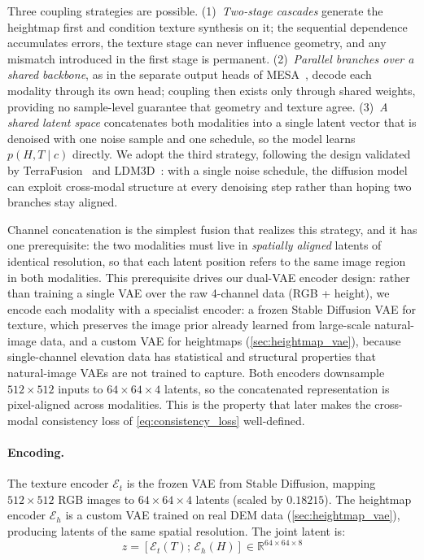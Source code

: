 \documentclass[review]{vgtc}                 %
\begin{document}
Three coupling strategies are possible.
(1)~\emph{Two-stage cascades} generate the heightmap first and condition texture synthesis on it; the sequential dependence accumulates errors, the texture stage can never influence geometry, and any mismatch introduced in the first stage is permanent.
(2)~\emph{Parallel branches over a shared backbone}, as in the separate output heads of MESA~\cite{MESA:2025}, decode each modality through its own head; coupling then exists only through shared weights, providing no sample-level guarantee that geometry and texture agree.
(3)~\emph{A shared latent space} concatenates both modalities into a single latent vector that is denoised with one noise sample and one schedule, so the model learns $p(H, T \mid c)$ directly.
We adopt the third strategy, following the design validated by TerraFusion~\cite{TerraFusion:2025} and LDM3D~\cite{LDM3D:2023}: with a single noise schedule, the diffusion model can exploit cross-modal structure at every denoising step rather than hoping two branches stay aligned.

Channel concatenation is the simplest fusion that realizes this strategy, and it has one prerequisite: the two modalities must live in \emph{spatially aligned} latents of identical resolution, so that each latent position refers to the same image region in both modalities.
This prerequisite drives our dual-VAE encoder design: rather than training a single VAE over the raw 4-channel data (RGB + height), we encode each modality with a specialist encoder: a frozen Stable Diffusion VAE for texture, which preserves the image prior already learned from large-scale natural-image data, and a custom VAE for heightmaps (\cref{sec:heightmap_vae}), because single-channel elevation data has statistical and structural properties that natural-image VAEs are not trained to capture.
Both encoders downsample $512 \times 512$ inputs to $64 \times 64 \times 4$ latents, so the concatenated representation is pixel-aligned across modalities. This is the property that later makes the cross-modal consistency loss of \cref{eq:consistency_loss} well-defined.

\paragraph{Encoding.}
The texture encoder $\mathcal{E}_t$ is the frozen VAE from Stable Diffusion, mapping $512 \times 512$ RGB images to $64 \times 64 \times 4$ latents (scaled by $0.18215$).
The heightmap encoder $\mathcal{E}_h$ is a custom VAE trained on real DEM data (\cref{sec:heightmap_vae}), producing latents of the same spatial resolution.
The joint latent is:
\begin{equation}
  z = [\mathcal{E}_t(T);\, \mathcal{E}_h(H)] \in \mathbb{R}^{64 \times 64 \times 8}
  \label{eq:joint_latent}
\end{equation}
\end{document}
